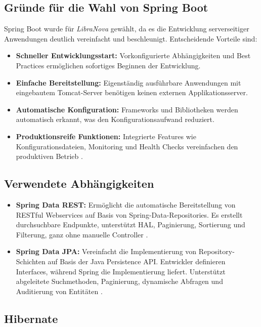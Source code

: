 \subsection*{Gründe für die Wahl von Spring Boot}
Spring Boot wurde für \textit{LibraNova} gewählt, da es die Entwicklung serverseitiger Anwendungen deutlich vereinfacht und beschleunigt. Entscheidende Vorteile sind:
\begin{itemize}
	\item \textbf{Schneller Entwicklungsstart:} Vorkonfigurierte Abhängigkeiten und Best Practices ermöglichen sofortiges Beginnen der Entwicklung.
	\item \textbf{Einfache Bereitstellung:} Eigenständig ausführbare Anwendungen mit eingebautem Tomcat-Server benötigen keinen externen Applikationsserver.
	\item \textbf{Automatische Konfiguration:} Frameworks und Bibliotheken werden automatisch erkannt, was den Konfigurationsaufwand reduziert.
	\item \textbf{Produktionsreife Funktionen:} Integrierte Features wie Konfigurationsdateien, Monitoring und Health Checks vereinfachen den produktiven Betrieb \cite{SPRINGBOOT2025b}.
\end{itemize}

\subsection*{Verwendete Abhängigkeiten}

\begin{itemize}
	\item \textbf{Spring Data REST:} Ermöglicht die automatische Bereitstellung von RESTful Webservices auf Basis von Spring-Data-Repositories. Es erstellt durchsuchbare Endpunkte, unterstützt HAL, Paginierung, Sortierung und Filterung, ganz ohne manuelle Controller \cite{SPRINGREST2025}.
	
	\item \textbf{Spring Data JPA:} Vereinfacht die Implementierung von Repository-Schichten auf Basis der Java Persistence API. Entwickler definieren Interfaces, während Spring die Implementierung liefert. Unterstützt abgeleitete Suchmethoden, Paginierung, dynamische Abfragen und Auditierung von Entitäten \cite{SPRINGJPA2025}.
\end{itemize}


\subsection{Hibernate}

